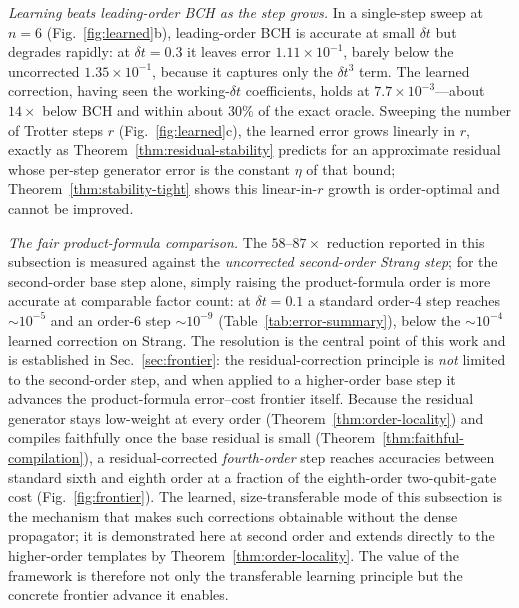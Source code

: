 \documentclass[aps,prxquantum,reprint,superscriptaddress,nofootinbib,amsmath,amssymb]{revtex4-2}
\newcommand{\dt}{\delta t}
\begin{document}
\emph{Learning beats leading-order BCH as the step grows.} In a single-step sweep at $n=6$ (Fig.~\ref{fig:learned}b), leading-order BCH is accurate at small $\dt$ but degrades rapidly: at $\dt=0.3$ it leaves error $1.11\times10^{-1}$, barely below the uncorrected $1.35\times10^{-1}$, because it captures only the $\dt^3$ term. The learned correction, having seen the working-$\dt$ coefficients, holds at $7.7\times10^{-3}$---about $14\times$ below BCH and within about $30\%$ of the exact oracle. Sweeping the number of Trotter steps $r$ (Fig.~\ref{fig:learned}c), the learned error grows linearly in $r$, exactly as Theorem~\ref{thm:residual-stability} predicts for an approximate residual whose per-step generator error is the constant $\eta$ of that bound; Theorem~\ref{thm:stability-tight} shows this linear-in-$r$ growth is order-optimal and cannot be improved.

\emph{The fair product-formula comparison.} The $58$--$87\times$ reduction reported in this subsection is measured against the \emph{uncorrected second-order Strang step}; for the second-order base step alone, simply raising the product-formula order is more accurate at comparable factor count: at $\dt=0.1$ a standard order-4 step reaches $\sim10^{-5}$ and an order-6 step $\sim10^{-9}$ (Table~\ref{tab:error-summary}), below the $\sim10^{-4}$ learned correction on Strang. The resolution is the central point of this work and is established in Sec.~\ref{sec:frontier}: the residual-correction principle is \emph{not} limited to the second-order step, and when applied to a higher-order base step it advances the product-formula error--cost frontier itself. Because the residual generator stays low-weight at every order (Theorem~\ref{thm:order-locality}) and compiles faithfully once the base residual is small (Theorem~\ref{thm:faithful-compilation}), a residual-corrected \emph{fourth-order} step reaches accuracies between standard sixth and eighth order at a fraction of the eighth-order two-qubit-gate cost (Fig.~\ref{fig:frontier}). The learned, size-transferable mode of this subsection is the mechanism that makes such corrections obtainable without the dense propagator; it is demonstrated here at second order and extends directly to the higher-order templates by Theorem~\ref{thm:order-locality}. The value of the framework is therefore not only the transferable learning principle but the concrete frontier advance it enables.
\end{document}
